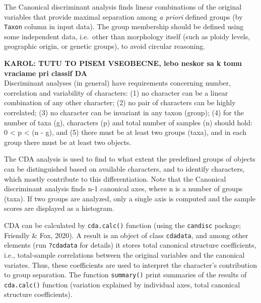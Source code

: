 \documentclass[
]{article}
\begin{document}
The Canonical discriminant analysis finds linear combinations of the
original variables that provide maximal separation among \emph{a priori}
defined groups (by \texttt{Taxon} column in input data). The group
membership should be defined using some independent data, i.e.~other
than morphology itself (such as ploidy levels, geographic origin, or
genetic groups), to avoid circular reasoning.

\textbf{KAROL: TUTU TO PISEM VSEOBECNE, lebo neskor sa k tomu vraciame
pri classif DA}\\
Discriminant analyses (in general) have requirements concerning number,
correlation and variability of characters: (1) no character can be a
linear combination of any other character; (2) no pair of characters can
be highly correlated; (3) no character can be invariant in any taxon
(group); (4) for the number of taxa (g), characters (p) and total number
of samples (n) should hold: 0 \textless{} p \textless{} (n - g), and (5)
there must be at least two groups (taxa), and in each group there must
be at least two objects.

The CDA analysis is used to find to what extent the predefined groups of
objects can be distinguished based on available characters, and to
identify characters, which mostly contribute to this differentiation.
Note that the Canonical discriminant analysis finds n-1 canonical axes,
where n is a number of groups (taxa). If two groups are analyzed, only a
single axis is computed and the sample scores are displayed as a
histogram.

CDA can be calculated by \texttt{cda.calc()} function (using the
\texttt{candisc} package; Friendly \& Fox, 2020). A result is an object
of class \texttt{cdadata}, and among other elements (run
\texttt{?cdadata} for details) it stores total canonical structure
coefficients, i.e., total-sample correlations between the original
variables and the canonical variates. Thus, these coefficients are used
to interpret the character's contribution to group separation. The
function \texttt{summary()} print summaries of the results of
\texttt{cda.calc()} function (variation explained by individual axes,
total canonical structure coefficients).
\end{document}
